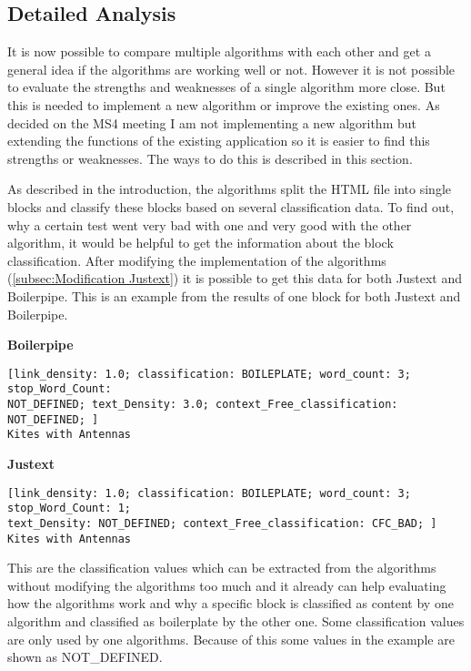 \subsection{Detailed Analysis}
\label{subsec:Detailed Analysis}

It is now possible to compare multiple algorithms with each other and get a general idea if the algorithms are working well or not. However it is not possible to evaluate the strengths and weaknesses of a single algorithm more close. But this is needed to implement a new algorithm or improve the existing ones. As decided on the MS4 meeting I am not implementing a new algorithm but extending the functions of the existing application so it is easier to find this strengths or weaknesses. The ways to do this is described in this section.

As described in the introduction, the algorithms split the HTML file into single blocks and classify these blocks based on several classification data. To find out, why a certain test went very bad with one and very good with the other algorithm, it would be helpful to get the information about the block classification. After modifying the implementation of the algorithms (\ref{subsec:Modification Justext}) it is possible to get this data for both Justext and Boilerpipe. This is an example from the results of one block for both Justext and Boilerpipe.


\textbf{Boilerpipe}
\begin{lstlisting}
[link_density: 1.0; classification: BOILEPLATE; word_count: 3; stop_Word_Count: 
NOT_DEFINED; text_Density: 3.0; context_Free_classification: NOT_DEFINED; ]
Kites with Antennas
\end{lstlisting}


\textbf{Justext}
\begin{lstlisting}
[link_density: 1.0; classification: BOILEPLATE; word_count: 3; stop_Word_Count: 1; 
text_Density: NOT_DEFINED; context_Free_classification: CFC_BAD; ] 
Kites with Antennas
\end{lstlisting}







This are the classification values which can be extracted from the algorithms without modifying the algorithms too much and it already can help evaluating how the algorithms work and why a specific block is classified as content by one algorithm and classified as boilerplate by the other one. Some classification values are only used by one algorithms. Because of this some values in the example are shown as NOT\_DEFINED.
